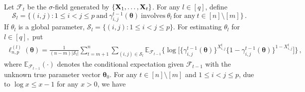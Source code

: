 \documentclass[12pt]{article}
\newcommand{\btheta}{\boldsymbol \theta}
\newcommand{\bX}{{\bf X}}
\newcommand{\0}{{\bf 0}}
\begin{document}
Let $\mathcal{F}_t$ be the $\sigma$-field generated by $\{\bX_1,\ldots,\bX_t\}$. For any $l\in[q]$, define
\begin{equation}\nonumber
\mathcal{S}_l=\big\{(i,j):1\leq i< j\leq p~\textrm{and}~\gamma_{i,j}^{t-1}(\btheta)~\textrm{involves}~\theta_l~\textrm{for any}~t\in[n]\setminus[m]\big\}\,.
\end{equation}
If $\theta_l$ is a global parameter, $\mathcal{S}_l=\{(i,j): 1\le i<j \le p\}$.  
For estimating $\theta_l$ for $l\in [q],$
put
\begin{align} 
\ell_{n,p}^{(l)}(\btheta)=\frac{1}{(n-m)|\mathcal{S}_l|}\sum_{t=m+1}^n\sum_{  (i,j) \in \mathcal{S}_l}\mathbb{E}_{\mathcal{F}_{t-1}}\big\{\log\big[\{\gamma_{i,j}^{t-1}(\btheta)\}^{X_{i,j}^t}\{1-\gamma_{i,j}^{t-1}(\btheta)\}^{1-X_{i,j}^t}\big]\big\}\,,
\label{eq:idelocf}
\end{align} 
where $\mathbb{E}_{\mathcal{F}_{t-1}}(\cdot)$ denotes the conditional expectation given $\mathcal{F}_{t-1}$ with the unknown true  parameter vector $\btheta_0$. %
For any $t\in[n]\setminus[m]$ and $1\leq i<j\leq p$, due to $\log x\leq x-1$ for any $x>0$, we have
\end{document}

